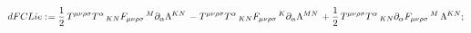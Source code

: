 \documentclass[11pt]{article}
\def\specialcolon{\mathrel{\mathop{:}}\hspace{-.5em}}
\begin{document}
\begin{dmath*}[compact, spread=2pt]
dFCLie\specialcolon{}= \frac{1}{2}\, {T}^{\mu \nu \rho \sigma} {T}^{\alpha}\,_{K N} {F}_{\mu \nu \rho \sigma}\,^{M} {\partial}_{\alpha}{{\Lambda}^{K N}}\,  - {T}^{\mu \nu \rho \sigma} {T}^{\alpha}\,_{K N} {F}_{\mu \nu \rho \sigma}\,^{K} {\partial}_{\alpha}{{\Lambda}^{M N}}\,  + \frac{1}{2}\, {T}^{\mu \nu \rho \sigma} {T}^{\alpha}\,_{K N} {\partial}_{\alpha}{{F}_{\mu \nu \rho \sigma}\,^{M}}\,  {\Lambda}^{K N};
\end{dmath*}
\end{document}
